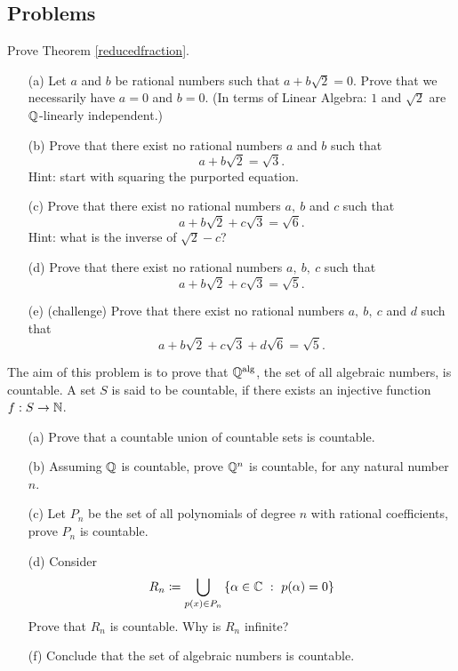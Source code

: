 \vspace*{0.5in}

\subsection{Problems}
\vspace{0.1in}

\begin{problem}\label{Problem 5.1}
Prove Theorem \ref{reducedfraction}.
\end{problem}

\vspace*{0.1in}

\begin{problem}\label{Problem 5.2}\hfill
\begin{itemize}
\item[(a)] Let $a$ and $b$ be rational numbers such that $a + b\sqrt{2} = 0$. Prove that we necessarily have $a = 0$ and $b = 0$. {\footnotesize (In terms of Linear Algebra: $1$ and $\sqrt{2}$ are $\mathbb Q$-linearly independent.)}
\item[(b)] Prove that there exist no rational numbers $a$ and $b$ such that
\[a + b\sqrt{2} = \sqrt{3}.\]
{\footnotesize Hint: start with squaring the purported equation.}
\item[(c)] Prove that there exist no rational numbers $a,\ b$ and $c$ such that
\[a + b\sqrt{2} + c\sqrt{3} = \sqrt{6}.\]
{\footnotesize Hint: what is the inverse of $\sqrt{2} - c$?} 
\item[(d)] Prove that there exist no rational numbers $a,\ b,\ c$ such that
\[a + b\sqrt{2} + c\sqrt{3} = \sqrt{5}.\]
\item[(e)] (challenge) Prove that there exist no rational numbers $a,\ b,\ c$ and $d$ such that
\[a + b\sqrt{2} + c\sqrt{3} + d\sqrt{6} = \sqrt{5}.\]
\end{itemize}
\end{problem}

\vspace*{0.1in}

\begin{problem}\label{Problem 5.3}
The aim of this problem is to prove that $\mathbb Q^{\text{alg}}$, the set of all algebraic numbers, is countable. A set $S$ is said to be countable, if there exists an injective function $f:S \to \mathbb N$.
\begin{itemize}
\item[(a)] Prove that a countable union of countable sets is countable.
\item[(b)] Assuming $\mathbb Q$ is countable, prove $\mathbb Q^n$ is countable, for any natural number $n$.
\item[(c)] Let $P_n$ be the set of all polynomials of degree $n$ with rational coefficients, prove $P_n$ is countable.
\item[(d)] Consider
\[R_n \coloneqq \bigcup_{p(x) \in P_n}\left\{\alpha \in \mathbb C\ :\ p(\alpha) = 0\right\}\]
Prove that $R_n$ is countable. Why is $R_n$ infinite?
\item[(f)] Conclude that the set of algebraic numbers is countable.
\end{itemize}
\end{problem}